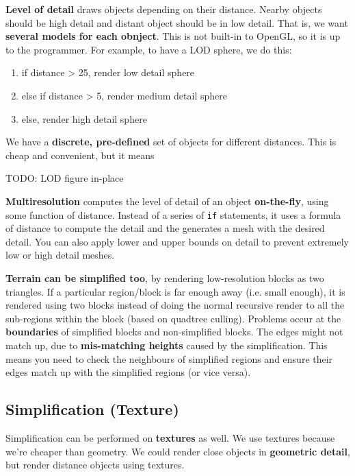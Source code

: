 \documentclass{article}
\begin{document}
\textbf{Level of detail} draws objects depending on their distance. Nearby objects should be high detail and distant object should be in low detail. That is, we want \textbf{several models for each obnject}. This is not built-in to OpenGL, so it is up to the programmer. For example, to have a LOD sphere, we do this:
\begin{enumerate}
	\item if distance > 25, render low detail sphere
	\item else if distance > 5, render medium detail sphere
	\item else, render high detail sphere
\end{enumerate}
We have a \textbf{discrete, pre-defined} set of objects for different distances. This is cheap and convenient, but it means 

TODO: LOD figure in-place

\textbf{Multiresolution} computes the level of detail of an object \textbf{on-the-fly}, using some function of distance. Instead of a series of \texttt{if} statements, it uses a formula of distance to compute the detail and the generates a mesh with the desired detail. You can also apply lower and upper bounds on detail to prevent extremely low or high detail meshes.

\textbf{Terrain can be simplified too}, by rendering low-resolution blocks as two triangles. If a particular region/block is far enough away (i.e. small enough), it is rendered using two blocks instead of doing the normal recursive render to all the sub-regions within the block (based on quadtree culling). Problems occur at the \textbf{boundaries} of simplified blocks and non-simplified blocks. The edges might not match up, due to \textbf{mis-matching heights} caused by the simplification. This means you need to check the neighbours of simplified regions and ensure their edges match up with the simplified regions (or vice versa).

\subsection{Simplification (Texture)}

Simplification can be performed on \textbf{textures} as well. We use textures because we're cheaper than geometry. We could render close objects in \textbf{geometric detail}, but render distance objects using textures.
\end{document}
